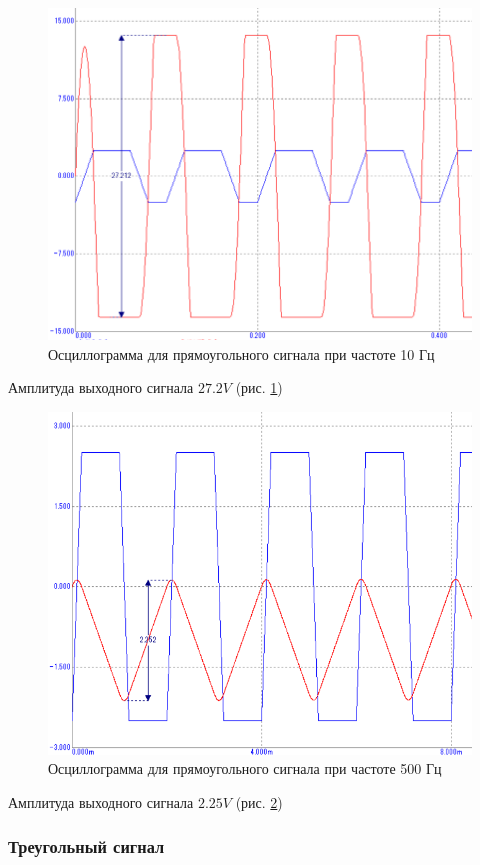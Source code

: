 \documentclass[a4paper,14pt]{article}
\begin{document}
\begin{figure}[H]
	\centering
	\includegraphics[width=0.7\linewidth]{../imgs/tran_square_10Hz}
	\caption{Осциллограмма для прямоугольного сигнала при частоте 10 Гц}
	\label{fig:tran_square_10Hz}
\end{figure}

Амплитуда выходного сигнала $27.2V$ (рис. \ref{fig:tran_square_10Hz})

\begin{figure}[H]
	\centering
	\includegraphics[width=0.7\linewidth]{../imgs/tran_square_500Hz}
	\caption{Осциллограмма для прямоугольного сигнала при частоте 500 Гц}
	\label{fig:tran_square_500Hz}
\end{figure}

Амплитуда выходного сигнала $2.25V$ (рис. \ref{fig:tran_square_500Hz})

\subsubsection{Треугольный сигнал}
\end{document}
